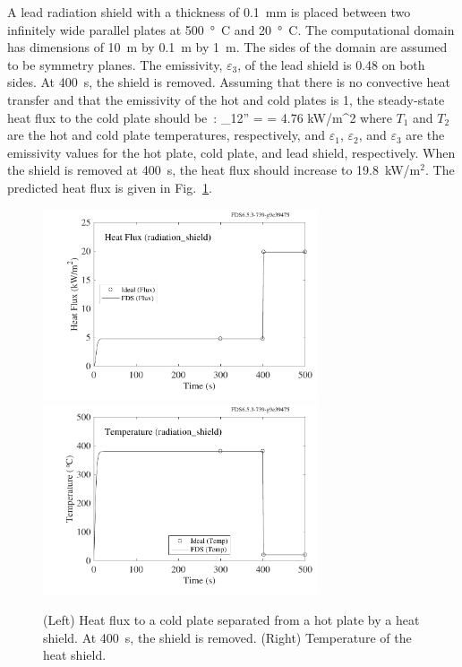 \documentclass[11pt]{book}
\begin{document}
A lead radiation shield with a thickness of 0.1~mm is placed between two infinitely wide parallel plates at 500~\si{\degree C} and 20~\si{\degree C}.
The computational domain has dimensions of 10~m by 0.1~m by 1~m. The sides of the domain are assumed to be symmetry planes.
The emissivity, $\varepsilon_{3}$, of the lead shield is 0.48 on both sides.  At 400~s, the shield is removed.
Assuming that there is no convective heat transfer and that the emissivity of the hot and cold plates is 1,
the steady-state heat flux to the cold plate should be~\cite{Incropera:1}:
\be
   \dq_{12}'' =  = 4.76 \; \hbox{kW/m}^2
\ee
where $T_{1}$ and $T_{2}$ are the hot and cold plate temperatures, respectively, and $\varepsilon_1$, $\varepsilon_2$, and $\varepsilon_3$ are the
emissivity values for the hot plate, cold plate, and lead shield, respectively. When the shield is removed at 400~s, the heat flux should increase to 19.8~kW/m$^2$.
The predicted heat flux is given in Fig.~\ref{radiation_shield_plot}.
\noindent
\begin{figure}[h]
\includegraphics[width=3.2in]{SCRIPT_FIGURES/radiation_shield_flux}
\includegraphics[width=3.2in]{SCRIPT_FIGURES/radiation_shield_temp}
\caption[The  test case]{(Left) Heat flux to a cold plate separated from a hot plate by a heat shield. At 400~s, the shield is removed. (Right)
Temperature of the heat shield.}
\label{radiation_shield_plot}
\end{figure}
\end{document}
